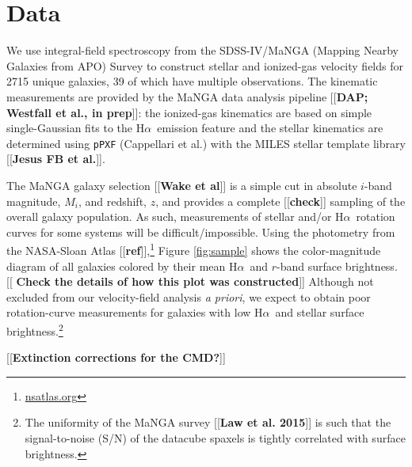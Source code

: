 \documentclass[apj,iop,revtex4,numberedappendix]{emulateapj}
\newcommand{\comment}[2][todo]{{\color{#1}[[{\bf #2}]]}}
\newcommand{\halpha}{H$\alpha$}
\begin{document}
\section{Data}
\label{sec:data}

We use integral-field spectroscopy from the SDSS-IV/MaNGA (Mapping
Nearby Galaxies from APO) Survey to construct stellar and ionized-gas
velocity fields for 2715 unique galaxies, 39 of which have multiple
observations.  The kinematic measurements are provided by the MaNGA data
analysis pipeline \comment{DAP; Westfall et al., in prep}: the
ionized-gas kinematics are based on simple single-Gaussian fits to the
\halpha\ emission feature and the stellar kinematics are determined
using {\tt pPXF} (Cappellari et al.) with the MILES stellar template
library \comment{Jesus FB et al.}.

The MaNGA galaxy selection \comment{Wake et al} is a simple cut in
absolute $i$-band magnitude, $M_i$, and redshift, $z$, and provides a
complete \comment{check} sampling of the overall galaxy population.  As
such, measurements of stellar and/or \halpha\ rotation curves for some
systems will be difficult/impossible.  Using the photometry from the
NASA-Sloan Atlas \comment{ref},\footnote{\url{nsatlas.org}} Figure
\ref{fig:sample} shows the color-magnitude diagram of all galaxies
colored by their mean \halpha\ and $r$-band surface brightness.
\comment{ Check the details of how this plot was constructed}  Although
not excluded from our velocity-field analysis {\em a priori}, we expect
to obtain poor rotation-curve measurements for galaxies with low
\halpha\ and stellar surface brightness.\footnote{
%
The uniformity of the MaNGA survey \comment{Law et al. 2015} is such
that the signal-to-noise (S/N) of the datacube spaxels is tightly
correlated with surface brightness.}

\comment{Extinction corrections for the CMD?}
\end{document}
